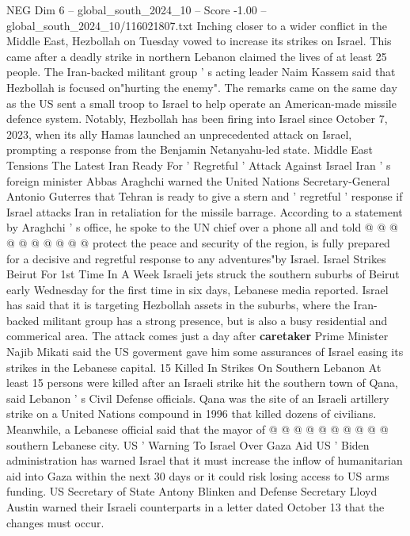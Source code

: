 \begin{textsample}{NEG Dim 6 – global\_south\_2024\_10 – Score -1.00 – global\_south\_2024\_10/116021807.txt}  \label{ex:f6_neg_060}
Inching closer to a wider conflict in the Middle East, Hezbollah on Tuesday vowed to increase its strikes on Israel.
This came after a deadly strike in northern Lebanon claimed the lives of at least 25 people.
The Iran-backed militant group ' s acting leader Naim Kassem said that Hezbollah is focused on"hurting the enemy".
The remarks came on the same day as the US sent a small troop to Israel to help operate an American-made missile defence system.
Notably, Hezbollah has been firing into Israel since October 7, 2023, when its ally Hamas launched an unprecedented attack on Israel, prompting a response from the Benjamin Netanyahu-led state.
Middle East Tensions The Latest Iran Ready For ' Regretful ' Attack Against Israel Iran ' s foreign minister Abbas Araghchi warned the United Nations Secretary-General Antonio Guterres that Tehran is ready to give a stern and ' regretful ' response if Israel attacks Iran in retaliation for the missile barrage.
According to a statement by Araghchi ' s office, he spoke to the UN chief over a phone all and told @ @ @ @ @ @ @ @ @ @ protect the peace and security of the region, is fully prepared for a decisive and regretful response to any adventures"by Israel.
Israel Strikes Beirut For 1st Time In A Week Israeli jets struck the southern suburbs of Beirut early Wednesday for the first time in six days, Lebanese media reported.
Israel has said that it is targeting Hezbollah assets in the suburbs, where the Iran-backed militant group has a strong presence, but is also a busy residential and commerical area.
The attack comes just a day after \textbf{caretaker} Prime Minister Najib Mikati said the US goverment gave him some assurances of Israel easing its strikes in the Lebanese capital. 15 Killed In Strikes On Southern Lebanon At least 15 persons were killed after an Israeli strike hit the southern town of Qana, said Lebanon ' s Civil Defense officials.
Qana was the site of an Israeli artillery strike on a United Nations compound in 1996 that killed dozens of civilians.
Meanwhile, a Lebanese official said that the mayor of @ @ @ @ @ @ @ @ @ @ southern Lebanese city.
US ' Warning To Israel Over Gaza Aid US ' Biden administration has warned Israel that it must increase the inflow of humanitarian aid into Gaza within the next 30 days or it could risk losing access to US arms funding.
US Secretary of State Antony Blinken and Defense Secretary Lloyd Austin warned their Israeli counterparts in a letter dated October 13 that the changes must occur.

\end{textsample}
